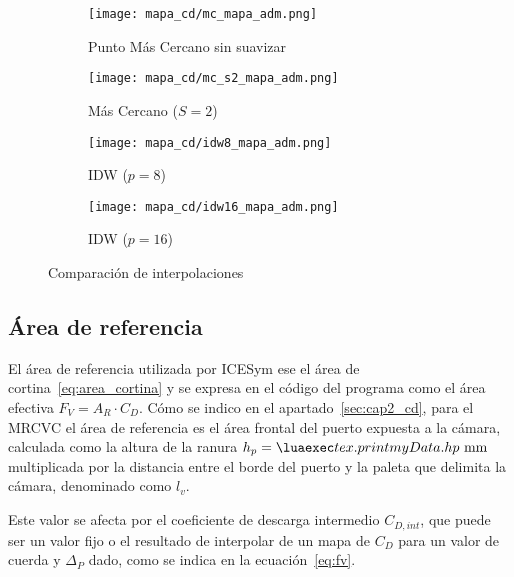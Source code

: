 {\begin{figure}
    \centering
    \begin{subfigure}{0.4\textwidth}
        \centering
        \texttt{[image: mapa\_cd/mc\_mapa\_adm.png]}
        \caption{Punto Más Cercano sin suavizar}
    \end{subfigure}
    \hfill
    \begin{subfigure}{0.4\textwidth}
        \centering
        \texttt{[image: mapa\_cd/mc\_s2\_mapa\_adm.png]}
        \caption{Más Cercano ($S=2$)}
    \end{subfigure}
    \hfill
    \begin{subfigure}{0.4\textwidth}
        \centering
        \texttt{[image: mapa\_cd/idw8\_mapa\_adm.png]}
        \caption{IDW ($p=8$)}
    \end{subfigure}
    \hfill
    \begin{subfigure}{0.4\textwidth}
        \centering
        \texttt{[image: mapa\_cd/idw16\_mapa\_adm.png]}
        \caption{IDW ($p=16$)}
    \end{subfigure}
    \caption{Comparación de interpolaciones}\label{fig:mapas_interpolados}
\end{figure}


\subsection{Área de referencia}
%
El área de referencia utilizada por ICESym ese el área de
cortina~\ref{eq:area_cortina} y se expresa en el código del programa como el
área efectiva $F_{V}=A_{R}\cdot C_{D}$.
%
Cómo se indico en el apartado~\ref{sec:cap2_cd}, para el  MRCVC el área de
referencia es el área frontal del puerto expuesta a la cámara, calculada como la
altura de la ranura $h_{p}=\lua{tex.print{myData.hp}}\text{ mm}$ multiplicada
por la distancia entre el borde del puerto y la paleta que delimita la cámara,
denominado como $l_{v}$.

%
%
Este valor se afecta por el coeficiente de descarga intermedio $C_{D,int}$, que
puede ser un valor fijo o el resultado de interpolar de un mapa de $C_D$ para un
valor de cuerda y $\Delta_P$ dado, como se indica en la ecuación~\ref{eq:fv}.

}
